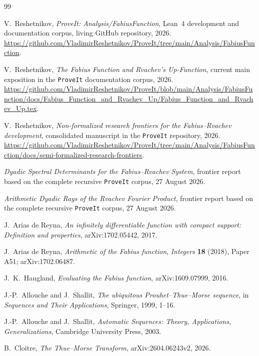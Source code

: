 \documentclass[11pt,oneside]{article}
\theoremstyle{definition}
\theoremstyle{remark}
\begin{document}
\begin{thebibliography}{99}

V.~Reshetnikov,
\emph{ProveIt: Analysis/FabiusFunction},
Lean~4 development and documentation corpus, living GitHub repository, 2026.
\url{https://github.com/VladimirReshetnikov/ProveIt/tree/main/Analysis/FabiusFunction}.

V.~Reshetnikov,
\emph{The Fabius Function and Rvachev's Up-Function},
current main exposition in the \texttt{ProveIt} documentation corpus, 2026.
\url{https://github.com/VladimirReshetnikov/ProveIt/blob/main/Analysis/FabiusFunction/docs/Fabius_Function_and_Rvachev_Up/Fabius_Function_and_Rvachev_Up.tex}.

V.~Reshetnikov,
\emph{Non-formalized research frontiers for the Fabius--Rvachev development},
consolidated manuscript in the \texttt{ProveIt} repository, 2026.
\url{https://github.com/VladimirReshetnikov/ProveIt/tree/main/Analysis/FabiusFunction/docs/semi-formalized-research-frontiers}.

\emph{Dyadic Spectral Determinants for the Fabius--Rvachev System},
frontier report based on the complete recursive \texttt{ProveIt} corpus,
27 August 2026.

\emph{Arithmetic Dyadic Rays of the Rvachev Fourier Product},
frontier report based on the complete recursive \texttt{ProveIt} corpus,
27 August 2026.

J.~Arias de Reyna,
\emph{An infinitely differentiable function with compact support: Definition and properties},
arXiv:1702.05442, 2017.

J.~Arias de Reyna,
\emph{Arithmetic of the Fabius function},
\emph{Integers} \textbf{18} (2018), Paper A51;
arXiv:1702.06487.

J.~K.~Haugland,
\emph{Evaluating the Fabius function},
arXiv:1609.07999, 2016.

J.-P.~Allouche and J.~Shallit,
\emph{The ubiquitous Prouhet--Thue--Morse sequence},
in \emph{Sequences and Their Applications}, Springer, 1999, 1--16.

J.-P.~Allouche and J.~Shallit,
\emph{Automatic Sequences: Theory, Applications, Generalizations},
Cambridge University Press, 2003.

B.~Cloitre,
\emph{The Thue--Morse Transform},
arXiv:2604.06243v2, 2026.


\end{thebibliography}
\end{document}
